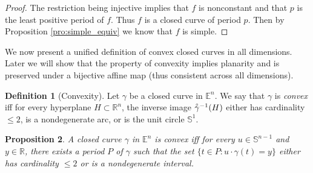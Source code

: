\documentclass{amsart}
\newtheorem{proposition}{Proposition}[section]
\theoremstyle{definition}
\newtheorem{definition}[proposition]{Definition}
\theoremstyle{remark}
\newcommand{\lring}[1]{\accentset{\circ}{#1}}
\begin{document}
\begin{proof}
    The restriction being injective implies that
    $f$ is nonconstant and that $p$ is the least positive
    period of $f$. Thus $f$ is a closed curve of period $p$.
    Then by Proposition \ref{pro:simple_equiv}
    we know that $f$ is simple.
\end{proof}

We now present a unified definition of convex closed curves in
all dimensions. Later we will show that the property of convexity
implies planarity and is preserved under a bijective affine map
(thus consistent across all dimensions).

\begin{definition}[Convexity]
    Let $\gamma$ be a closed curve in $\mathbb{E}^n$.
    We say that $\gamma$ is \emph{convex} iff
    for every hyperplane $H\subset\mathbb{R}^n$,
    the inverse image $\lring{\gamma}^{-1}(H)$ either
    has cardinality $\le2$, is a nondegenerate arc,
    or is the unit circle $\mathbb{S}^1$.
\end{definition}

\begin{proposition}
    \label{pro:convex_equiv}
    A closed curve $\gamma$ in $\mathbb{E}^n$ is convex
    iff for every $u\in\mathbb{S}^{n-1}$ and $y\in\mathbb{R}$,
    there exists a period $P$ of $\gamma$ such that
    the set $\{t\in P:u\cdot\gamma(t)=y\}$ either
    has cardinality $\le2$ or is a nondegenerate interval.
\end{proposition}
\end{document}
